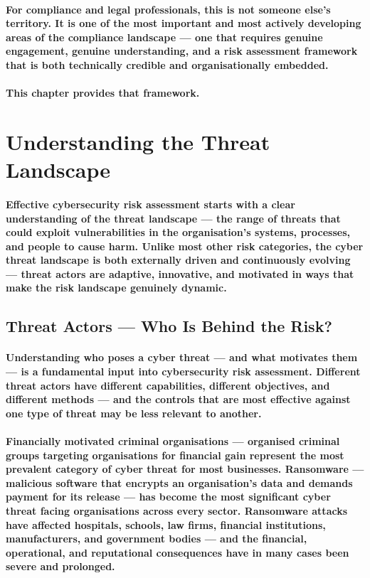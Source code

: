 \paragraph{For compliance and legal professionals, this is not someone else's territory. It is one of the most important and most actively developing areas of the compliance landscape — one that requires genuine engagement, genuine understanding, and a risk assessment framework that is both technically credible and organisationally embedded.}
\paragraph{This chapter provides that framework.}

\section{Understanding the Threat Landscape}
\paragraph{Effective cybersecurity risk assessment starts with a clear understanding of the threat landscape — the range of threats that could exploit vulnerabilities in the organisation's systems, processes, and people to cause harm. Unlike most other risk categories, the cyber threat landscape is both externally driven and continuously evolving — threat actors are adaptive, innovative, and motivated in ways that make the risk landscape genuinely dynamic.}

\subsection{Threat Actors — Who Is Behind the Risk?}
\paragraph{Understanding who poses a cyber threat — and what motivates them — is a fundamental input into cybersecurity risk assessment. Different threat actors have different capabilities, different objectives, and different methods — and the controls that are most effective against one type of threat may be less relevant to another.}
\paragraph{\textbf{Financially motivated criminal organisations} — organised criminal groups targeting organisations for financial gain represent the most prevalent category of cyber threat for most businesses. Ransomware — malicious software that encrypts an organisation's data and demands payment for its release — has become the most significant cyber threat facing organisations across every sector. Ransomware attacks have affected hospitals, schools, law firms, financial institutions, manufacturers, and government bodies — and the financial, operational, and reputational consequences have in many cases been severe and prolonged.}
